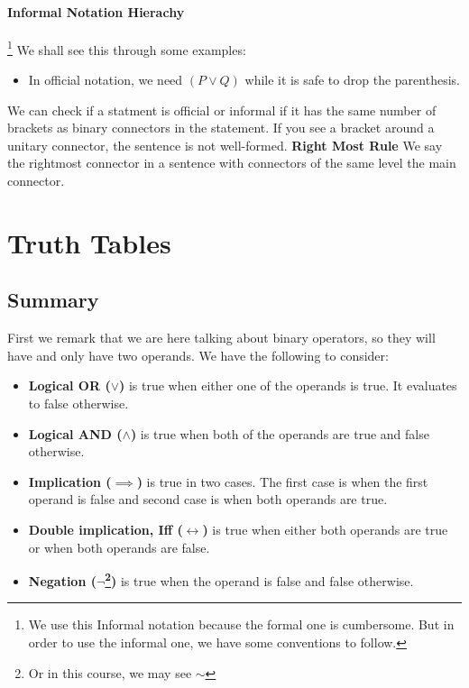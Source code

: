 \documentclass[10pt]{article}
\renewcommand{\iff}{\leftrightarrow}
\begin{document}
\paragraph{Informal Notation Hierachy}\footnote{We use this Informal notation because the formal one is cumbersome. But in order to use the informal one, we have some conventions to follow.} 
We shall see this through some examples:
\begin{itemize}
    \item In official notation, we need $(P\vee Q)$ while it is safe to drop the parenthesis.
\end{itemize}
We can check if a statment is official or informal if it has the same number of brackets as binary connectors in the statement. If you see a bracket around a unitary connector, the sentence is not well-formed.
\textbf{Right Most Rule} We say the rightmost connector in a sentence with connectors of the same level the main connector.



\section{Truth Tables}
\subsection{Summary} First we remark that we are here talking about binary operators, 
so they will have and only have two operands. We have the following to consider:
\begin{itemize}
    \item \textbf{Logical OR ($\vee$)} is true when either one of the operands is true. 
        It evaluates to false otherwise.
    \item \textbf{Logical AND ($\land$)} is true when both of the operands are true and false otherwise.
    \item \textbf{Implication ($\implies$)} is true in two cases. The first case is when the
        first operand is false and second case is when both operands are true.
    \item \textbf{Double implication, Iff ($\iff$)} is true when either both operands are true 
        or when both operands are false.
    \item \textbf{Negation ($\neg$\footnote{Or in this course, we may see $\sim$})} is true when the operand
        is false and false otherwise.
\end{itemize}
\end{document}
